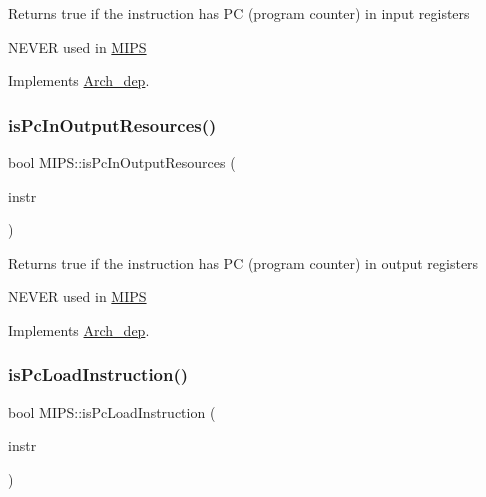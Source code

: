 Returns true if the instruction has PC (program counter) in input registers

N\+E\+V\+ER used in \hyperlink{classMIPS}{M\+I\+PS} 

Implements \hyperlink{classArch__dep_ac6456dfba496bcf104d460c8610a484f}{Arch\+\_\+dep}.

\mbox{\label{classMIPS_a68497c5e46c6106133d4bf5a01db6e7d}} 
\subsubsection{\texorpdfstring{is\+Pc\+In\+Output\+Resources()}{isPcInOutputResources()}}
{\footnotesize\ttfamily bool M\+I\+P\+S\+::is\+Pc\+In\+Output\+Resources (\begin{DoxyParamCaption}\item[{const \hyperlink{classObjdumpInstruction}{Objdump\+Instruction} \&}]{instr }\end{DoxyParamCaption})\hspace{0.3cm}{\ttfamily [virtual]}}

Returns true if the instruction has PC (program counter) in output registers

N\+E\+V\+ER used in \hyperlink{classMIPS}{M\+I\+PS} 

Implements \hyperlink{classArch__dep_a89b89f3e5248442dda296986f5673bb6}{Arch\+\_\+dep}.

\mbox{\label{classMIPS_ae38afe5659e9efe2ff909fa5c4acc047}} 
\subsubsection{\texorpdfstring{is\+Pc\+Load\+Instruction()}{isPcLoadInstruction()}}
{\footnotesize\ttfamily bool M\+I\+P\+S\+::is\+Pc\+Load\+Instruction (\begin{DoxyParamCaption}\item[{string \&}]{instr }\end{DoxyParamCaption})\hspace{0.3cm}{\ttfamily [virtual]}}



